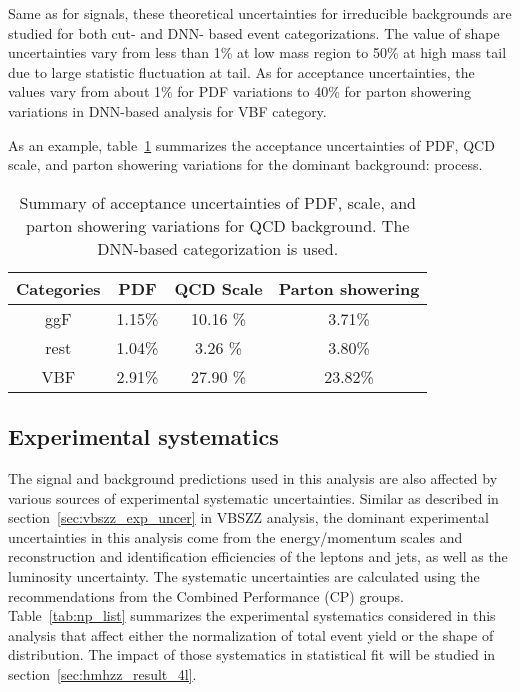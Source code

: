 Same as for signals, these theoretical uncertainties for irreducible backgrounds are studied for both cut- and DNN- based event categorizations.
The value of shape uncertainties vary from less than 1\% at low mass region to 50\% at high mass tail due to large statistic fluctuation at tail.
As for acceptance uncertainties, the values vary from about 1\% for PDF variations to 40\% for parton showering variations in DNN-based analysis for VBF category.

As an example, table~\ref{tab:acc-all-qqZZ_DNN} summarizes the acceptance uncertainties of PDF, QCD scale, and parton showering variations for the dominant background: \qqZZ process.

\begin{table}[htbp]
  \centering
  \caption{Summary of acceptance uncertainties of PDF, scale, and parton showering variations for QCD \qqZZ background. The DNN-based categorization is used.}
  \label{tab:acc-all-qqZZ_DNN}
  \begin{spacing}{0.75}
  \begin{tabular}{cccc}
    \toprule
    Categories  & PDF    & QCD Scale   & Parton showering \\
    \midrule
    ggF  & 1.15\% & 10.16 \% & 3.71\% \\
    rest & 1.04\% & 3.26  \% & 3.80\% \\
    VBF  & 2.91\% & 27.90 \% & 23.82\% \\
    \bottomrule
  \end{tabular}
  \end{spacing}
\end{table}

\subsection{Experimental systematics}

The signal and background predictions used in this analysis are also affected by various sources of experimental systematic uncertainties.
Similar as described in section~\ref{sec:vbszz_exp_uncer} in VBSZZ analysis, the dominant experimental uncertainties in this analysis come from the energy/momentum scales 
and reconstruction and identification efficiencies of the leptons and jets, as well as the luminosity uncertainty.
The systematic uncertainties are calculated using the recommendations from the Combined Performance (CP) groups.
Table~\ref{tab:np_list} summarizes the experimental systematics considered in this analysis that affect either the normalization of total event yield or the shape of \mfl distribution.
The impact of those systematics in statistical fit will be studied in section~\ref{sec:hmhzz_result_4l}.

